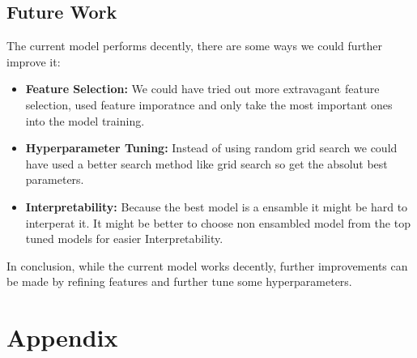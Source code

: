 \documentclass[a4paper,12pt]{article}
\begin{document}
\subsection{Future Work}
The current model performs decently, there are some ways we could further improve it:
\begin{itemize}
    \item \textbf{Feature Selection:} We could have tried out more extravagant feature selection, used feature imporatnce and only take the most important ones into the model training.
    \item \textbf{Hyperparameter Tuning:} Instead of using random grid search we could have used a better search method like grid search so get the absolut best parameters.
    \item \textbf{Interpretability:} Because the best model is a ensamble it might be hard to interperat it. It might be better to choose non ensambled model from the top tuned models for easier Interpretability.
\end{itemize}

In conclusion, while the current model works decently, further improvements can be made by refining features and further tune some hyperparameters.


\clearpage

\appendix
\section*{Appendix}
\end{document}
